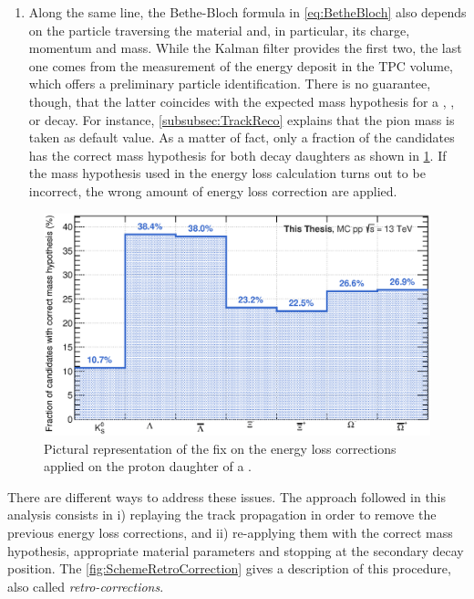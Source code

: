 \begin{enumerate}
\item Along the same line, the Bethe-Bloch formula in \eq\ref{eq:BetheBloch} also depends on the particle traversing the material and, in particular, its charge, momentum and mass. While the Kalman filter provides the first two, the last one comes from the measurement of the energy deposit in the TPC volume, which offers a preliminary particle identification. There is no guarantee, though, that the latter coincides with the expected mass hypothesis  for a \rmKzeroS, \rmLambdaPM, \rmXiPM or \rmOmegaPM decay. For instance, \Sec\ref{subsubsec:TrackReco} explains that the pion mass is taken as default value. As a matter of fact, only a fraction of the candidates has the correct mass hypothesis for both decay daughters as shown in \fig\ref{fig:FractionOfPIDForTracking}. If the mass hypothesis used in the energy loss calculation turns out to be incorrect, the wrong amount of energy loss correction are applied.

\end{enumerate}

\begin{figure}[H]
	\centering
	\includegraphics[width=1\textwidth]{Figs/Chapter5/FractionOfPIDForTracking.eps}
	\caption{Pictural representation of the fix on the energy loss corrections applied on the proton daughter of a \rmLambdaPM.}
	\label{fig:FractionOfPIDForTracking}
\end{figure}


There are different ways to address these issues. The approach followed in this analysis consists in i) replaying the track propagation in order to remove the previous energy loss corrections, and ii) re-applying them with the correct mass hypothesis, appropriate material parameters and stopping at the secondary decay position. The \fig\ref{fig:SchemeRetroCorrection} gives a description of this procedure, also called \textit{retro-corrections}.

